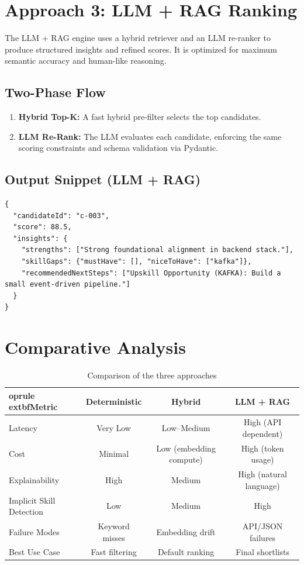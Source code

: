 \documentclass[12pt,a4paper]{article}
\begin{document}
\section{Approach 3: LLM + RAG Ranking}
The LLM + RAG engine uses a hybrid retriever and an LLM re-ranker to produce structured insights and refined scores. It is optimized for maximum semantic accuracy and human-like reasoning.

\subsection{Two-Phase Flow}
\begin{enumerate}
    \item \textbf{Hybrid Top-K:} A fast hybrid pre-filter selects the top candidates.
    \item \textbf{LLM Re-Rank:} The LLM evaluates each candidate, enforcing the same scoring constraints and schema validation via Pydantic.
\end{enumerate}

\subsection{Output Snippet (LLM + RAG)}
\begin{lstlisting}
{
  "candidateId": "c-003",
  "score": 88.5,
  "insights": {
    "strengths": ["Strong foundational alignment in backend stack."],
    "skillGaps": {"mustHave": [], "niceToHave": ["kafka"]},
    "recommendedNextSteps": ["Upskill Opportunity (KAFKA): Build a small event-driven pipeline."]
  }
}
\end{lstlisting}

\section{Comparative Analysis}
\begin{table}[h]
\centering
\begin{tabular}{@{}lccc@{}}
	oprule
	extbf{Metric} & \textbf{Deterministic} & \textbf{Hybrid} & \textbf{LLM + RAG} \\ \midrule
Latency & Very Low & Low--Medium & High (API dependent) \\
Cost & Minimal & Low (embedding compute) & High (token usage) \\
Explainability & High & Medium & High (natural language) \\
Implicit Skill Detection & Low & Medium & High \\
Failure Modes & Keyword misses & Embedding drift & API/JSON failures \\
Best Use Case & Fast filtering & Default ranking & Final shortlists \\ \bottomrule
\end{tabular}
\caption{Comparison of the three approaches}
\end{table}
\end{document}
